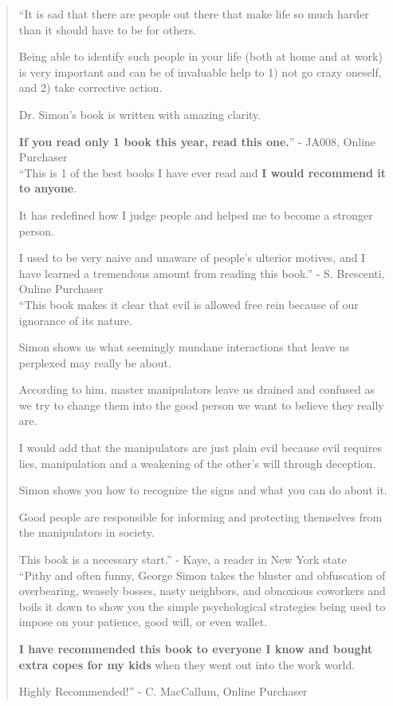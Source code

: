 \documentclass[oneside]{book}
\numberwithin{equation}{section}
\begin{document}
\begin{quotation}
    ``It is sad that there are people out there that make life so much harder than it should have to be for others.
    
    Being able to identify such people in your life (both at home and at work) is very important and can be of invaluable help to 1) not go crazy oneself, and 2) take corrective action.
    
    Dr. Simon's book is written with amazing clarity.
    
    \textbf{If you read only 1 book this year, read this one.}'' - JA008, Online Purchaser\\
    
    ``This is 1 of the best books I have ever read and \textbf{I would recommend it to anyone}.
    
    It has redefined how I judge people and helped me to become a stronger person.
    
    I used to be very naive and unaware of people's ulterior motives, and I have learned a tremendous amount from reading this book.'' - S. Brescenti, Online Purchaser\\
    
    ``This book makes it clear that evil is allowed free rein because of our ignorance of its nature.
    
    Simon shows us what seemingly mundane interactions that leave us perplexed may really be about.
    
    According to him, master manipulators leave us drained and confused as we try to change them into the good person we want to believe they really are.
    
    I would add that the manipulators are just plain evil because evil requires lies, manipulation and a weakening of the other's will through deception.
    
    Simon shows you how to recognize the signs and what you can do about it.
    
    Good people are responsible for informing and protecting themselves from the manipulators in society.
    
    This book is a necessary start.'' - Kaye, a reader in New York state\\
    
    ``Pithy and often funny, George Simon takes the bluster and obfuscation of overbearing, weasely bosses, nasty neighbors, and obnoxious coworkers and boils it down to show you the simple psychological strategies being used to impose on your patience, good will, or even wallet.
    
    \textbf{I have recommended this book to everyone I know and bought extra copes for my kids} when they went out into the work world.
    
    Highly Recommended!'' - C. MacCallum, Online Purchaser
\end{quotation}
\end{document}
